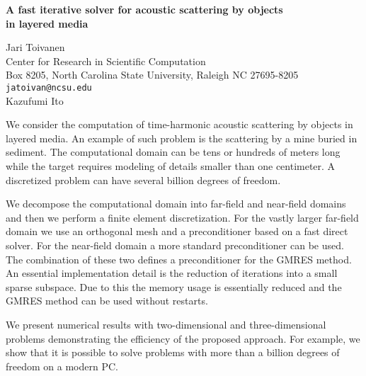 \documentclass{report}
\begin{document}

\begin{center}
{\large
{\bf A fast iterative solver for acoustic scattering by objects \\
	in layered media}}

	Jari Toivanen \\
	Center for Research in Scientific Computation \\
	Box 8205, North Carolina State University, Raleigh NC 27695-8205 \\
	{\tt jatoivan@ncsu.edu} \\
	Kazufumi Ito
\end{center}
We consider the computation of time-harmonic acoustic
scattering by objects in layered media. An example of such
problem is the scattering by a mine buried in sediment. The
computational domain can be tens or hundreds of meters long
while the target requires modeling of details smaller than
one centimeter. A discretized problem can have several
billion degrees of freedom.

We decompose the
computational domain into far-field and near-field domains
and then we perform a finite element discretization. For the
vastly larger far-field domain we use an orthogonal mesh and
a preconditioner based on a fast direct solver. For the
near-field domain a more standard preconditioner can be
used. The combination of these two defines a preconditioner
for the GMRES method. An essential implementation detail is
the reduction of iterations into a small sparse subspace.
Due to this the memory usage is essentially reduced and the
GMRES method can be used without restarts.

We present
numerical results with two-dimensional and three-dimensional
problems demonstrating the efficiency of the proposed
approach. For example, we show that it is possible to solve
problems with more than a billion degrees of freedom on a
modern PC.



\end{document}
